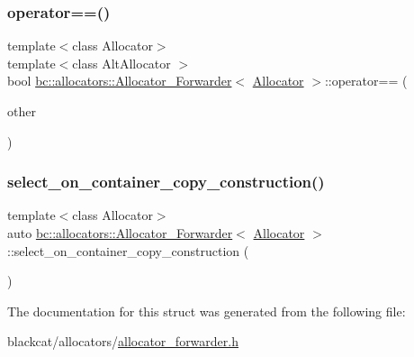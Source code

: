 \mbox{\label{structbc_1_1allocators_1_1Allocator__Forwarder_a2babb5f67db242f472698faa7b35d904}} 
\subsubsection{\texorpdfstring{operator==()}{operator==()}}
{\footnotesize\ttfamily template$<$class Allocator$>$ \\
template$<$class Alt\+Allocator $>$ \\
bool \hyperlink{structbc_1_1allocators_1_1Allocator__Forwarder}{bc\+::allocators\+::\+Allocator\+\_\+\+Forwarder}$<$ \hyperlink{classbc_1_1allocators_1_1Allocator}{Allocator} $>$\+::operator== (\begin{DoxyParamCaption}\item[{const Alt\+Allocator \&}]{other }\end{DoxyParamCaption})\hspace{0.3cm}{\ttfamily [inline]}}

\mbox{\label{structbc_1_1allocators_1_1Allocator__Forwarder_ae3b8cb6895bbbfa4a733a5ab786ae603}} 
\subsubsection{\texorpdfstring{select\+\_\+on\+\_\+container\+\_\+copy\+\_\+construction()}{select\_on\_container\_copy\_construction()}}
{\footnotesize\ttfamily template$<$class Allocator$>$ \\
auto \hyperlink{structbc_1_1allocators_1_1Allocator__Forwarder}{bc\+::allocators\+::\+Allocator\+\_\+\+Forwarder}$<$ \hyperlink{classbc_1_1allocators_1_1Allocator}{Allocator} $>$\+::select\+\_\+on\+\_\+container\+\_\+copy\+\_\+construction (\begin{DoxyParamCaption}{ }\end{DoxyParamCaption})\hspace{0.3cm}{\ttfamily [inline]}}



The documentation for this struct was generated from the following file\+:\begin{DoxyCompactItemize}
\item 
blackcat/allocators/\hyperlink{allocator__forwarder_8h}{allocator\+\_\+forwarder.\+h}\end{DoxyCompactItemize}
